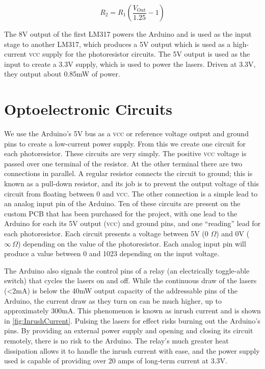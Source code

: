 \documentclass[11pt,oneside,final,letterpaper]{memoir}
\begin{document}
\begin{equation} \label{eq:LM317Resistors}
R_2 = R_1 \left( \frac{V_{\text{Out}}}{1.25} - 1\right)
\end{equation}

The 8V output of the first LM317 powers the Arduino and is used as the input stage to another LM317, which produces a 5V output which is used as a high-current \textsc{vcc} supply for the photoresistor circuits.  The 5V output is used as the input to create a 3.3V supply, which is used to power the lasers.  Driven at 3.3V, they output about 0.85mW of power.

\section*{Optoelectronic Circuits}

We use the Arduino's 5V bus as a \textsc{vcc} or reference voltage output and ground pins to create a low-current power supply.  From this we create one circuit for each photoresistor.  These circuits are very simply.  The positive \textsc{vcc} voltage is passed over one terminal of the resistor.  At the other terminal there are two connections in parallel.  A regular resistor connects the circuit to ground; this is known as a pull-down resistor, and its job is to prevent the output voltage of this circuit from floating between 0 and \textsc{vcc}.  The other connection is a simple lead to an analog input pin of the Arduino.  Ten of these circuits are present on the custom PCB that has been purchased for the project, with one lead to the Arduino for each its 5V output (\textsc{vcc}) and ground pins, and one ``reading'' lead for each photoresistor.  Each circuit presents a voltage between 5V (0 $\Omega$) and 0V ($\infty \, \Omega$) depending on the value of the photoresistor.  Each analog input pin will produce a value between 0 and 1023 depending on the input voltage.

The Arduino also signals the control pins of a relay (an electrically toggle-able switch) that cycles the lasers on and off.  While the continuous draw of the lasers (\textless\thinspace 2mA) is below the 40mW output capacity of the addressable pins of the Arduino, the current draw as they turn on can be much higher, up to approximately 300mA.  This phenomenon is known as inrush current and is shown in \autoref{fig:InrushCurrent}.  Pulsing the lasers for effect risks burning out the Arduino's pins.  By providing an external power supply and opening and closing its circuit remotely, there is no risk to the Arduino.  The relay's much greater heat dissipation allows it to handle the inrush current with ease, and the power supply used is capable of providing over 20 amps of long-term current at 3.3V.
\end{document}
